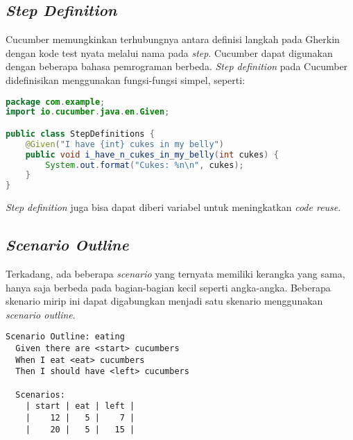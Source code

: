 \subsection{\emph{Step Definition}}

Cucumber memungkinkan terhubungnya antara definisi langkah pada Gherkin 
dengan kode test nyata melalui nama pada \emph{step}.
Cucumber dapat digunakan dengan beberapa bahasa pemrograman berbeda.
\emph{Step definition} pada Cucumber didefinisikan menggunakan fungsi-fungsi simpel, seperti:

\begin{lstlisting}[language=java]
package com.example;
import io.cucumber.java.en.Given;

public class StepDefinitions {
    @Given("I have {int} cukes in my belly")
    public void i_have_n_cukes_in_my_belly(int cukes) {
        System.out.format("Cukes: %n\n", cukes);
    }
}
\end{lstlisting}

\emph{Step definition} juga bisa dapat diberi variabel untuk meningkatkan \emph{code reuse}.

\subsection{\emph{Scenario Outline}}

Terkadang, ada beberapa \emph{scenario} yang ternyata memiliki kerangka yang sama,
hanya saja berbeda pada bagian-bagian kecil seperti angka-angka. Beberapa skenario
mirip ini dapat digabungkan menjadi satu skenario menggunakan \emph{scenario outline}.

\begin{lstlisting}[language=gherkin]
  Scenario Outline: eating
  Given there are <start> cucumbers
  When I eat <eat> cucumbers
  Then I should have <left> cucumbers

  Scenarios:
    | start | eat | left |
    |    12 |   5 |    7 |
    |    20 |   5 |   15 |
\end{lstlisting}